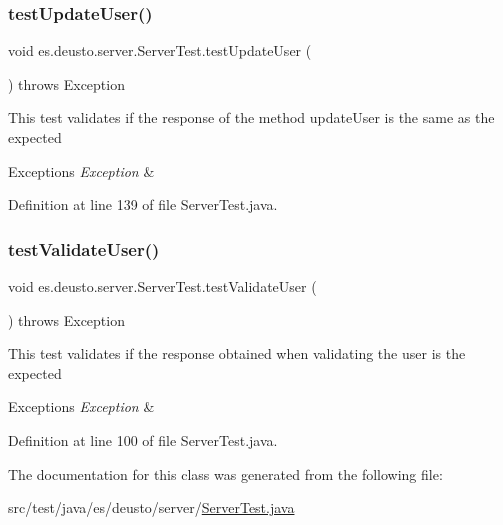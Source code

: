 \mbox{\label{classes_1_1deusto_1_1server_1_1_server_test_ad64ead953df265e40d07bdc0ab11137c}} 
\subsubsection{\texorpdfstring{test\+Update\+User()}{testUpdateUser()}}
{\footnotesize\ttfamily void es.\+deusto.\+server.\+Server\+Test.\+test\+Update\+User (\begin{DoxyParamCaption}{ }\end{DoxyParamCaption}) throws Exception}

This test validates if the response of the method update\+User is the same as the expected 
\begin{DoxyExceptions}{Exceptions}
{\em Exception} & \\
\hline
\end{DoxyExceptions}


Definition at line 139 of file Server\+Test.\+java.

\mbox{\label{classes_1_1deusto_1_1server_1_1_server_test_af493f29fde42af9e7d4c065f49bf8502}} 
\subsubsection{\texorpdfstring{test\+Validate\+User()}{testValidateUser()}}
{\footnotesize\ttfamily void es.\+deusto.\+server.\+Server\+Test.\+test\+Validate\+User (\begin{DoxyParamCaption}{ }\end{DoxyParamCaption}) throws Exception}

This test validates if the response obtained when validating the user is the expected 
\begin{DoxyExceptions}{Exceptions}
{\em Exception} & \\
\hline
\end{DoxyExceptions}


Definition at line 100 of file Server\+Test.\+java.



The documentation for this class was generated from the following file\+:\begin{DoxyCompactItemize}
\item 
src/test/java/es/deusto/server/\hyperlink{_server_test_8java}{Server\+Test.\+java}\end{DoxyCompactItemize}
